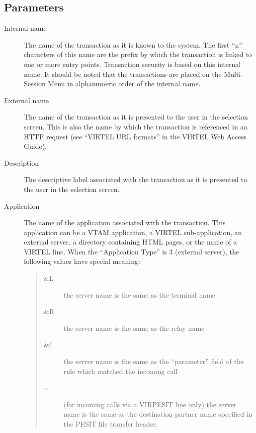 \documentclass[letterpaper,10pt,english]{sphinxmanual}
\begin{document}
\subsection{Parameters}
\label{\detokenize{connectivity_guide:id65}}\label{\detokenize{connectivity_guide:index-115}}\begin{description}
\item[{Internal name}] \leavevmode
The name of the transaction as it is known to the system. The first “n” characters of this name are the prefix by which the transaction is linked to one or more entry points. Transaction security is based on this internal name. It should be noted that the transactions are placed on the Multi-Session Menu in alphanumeric order of the internal name.

\item[{External name}] \leavevmode
The name of the transaction as it is presented to the user in the selection screen. This is also the name by which the transaction is referenced in an HTTP request (see “VIRTEL URL formats” in the VIRTEL Web Access Guide).

\item[{Description}] \leavevmode
The descriptive label associated with the transaction as it is presented to the user in the selection screen.

\item[{Application}] \leavevmode
The name of the application associated with the transaction. This application can be a VTAM application, a VIRTEL sub-application, an external server, a directory containing HTML pages, or the name of a VIRTEL line. When the “Application Type” is 3 (external server), the following values have special meaning:
\begin{quote}
\begin{description}
\item[{\&L}] \leavevmode
the server name is the same as the terminal name

\item[{\&R}] \leavevmode
the server name is the same as the relay name

\item[{\&1}] \leavevmode
the server name is the same as the “parameter” field of the rule which matched the incoming call

\item[{=}] \leavevmode
(for incoming calls via a VIRPESIT line only) the server name is the same as the destination partner name specified in the PESIT file transfer header.


\end{description}
\end{quote}
\end{description}
\end{document}
